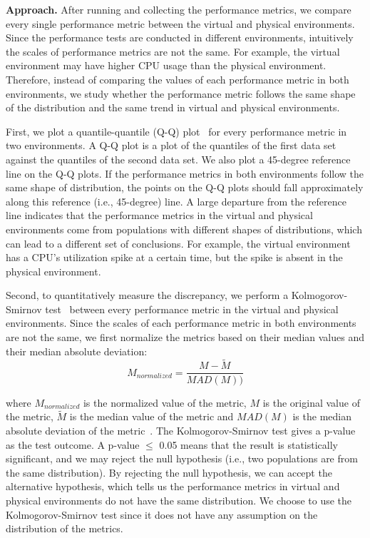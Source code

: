 \documentclass[smallextended]{svjour3}       %
\begin{document}
\noindent \textbf{Approach.} 
After running and collecting the performance metrics, we compare every single performance metric between the virtual and physical environments. Since the performance tests are conducted in different environments, intuitively the scales of performance metrics are not the same. For example, the virtual environment may have higher CPU usage than the physical environment. Therefore, instead of comparing the values of each performance metric in both environments, we study whether the performance metric follows the same shape of the distribution and the same trend in virtual and physical environments. 

First, we plot a quantile-quantile (Q-Q) plot~\cite{qqplots} for every performance metric in two environments. A Q-Q plot is a plot of the quantiles of the first data set against the quantiles of the second data set. We also plot a 45-degree reference line on the Q-Q plots. If the performance metrics in both environments follow the same shape of distribution, the points on the Q-Q plots should fall approximately along this reference (i.e., 45-degree) line. A large departure from the reference line indicates that the performance metrics in the virtual and physical environments come from populations with different shapes of distributions, which can lead to a different set of conclusions. For example, the virtual environment has a CPU's utilization spike at a certain time, but the spike is absent in the physical environment. 

Second, to quantitatively measure the discrepancy, we perform a Kolmogorov-Smirnov test~\cite{kstest} between every performance metric in the virtual and physical environments. Since the scales of each performance metric in both environments are not the same, we first normalize the metrics based on their median values and their median absolute deviation: 
\begin{equation}
\label{equ:mad}
M_{normalized}=\frac{M-\tilde{M}}{MAD(M))}		
\end{equation}

where $M_{normalized}$ is the normalized value of the metric, $M$ is the original value of the metric, $\tilde{M}$ is the median value of the metric and $MAD(M)$ is the median absolute deviation of the metric~\cite{walker1929studies}. The Kolmogorov-Smirnov test gives a p-value as the test outcome. A p-value $\leq$ 0.05 means that the result is statistically significant, and we may reject the null hypothesis (i.e., two populations are from the same distribution). By rejecting the null hypothesis, we can accept the alternative hypothesis, which tells us the performance metrics in virtual and physical environments do not have the same distribution. We choose to use the Kolmogorov-Smirnov test since it does not have any assumption on the distribution of the metrics.
\end{document}
